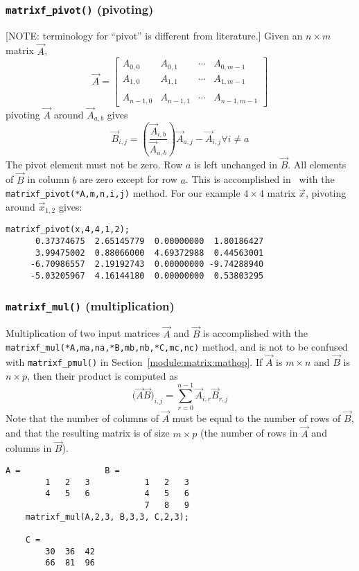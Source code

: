 \subsubsection{{\tt matrixf\_pivot()} (pivoting)}
\label{module:matrix:pivot}
[NOTE: terminology for ``pivot'' is different from literature.]
Given an $n \times m$ matrix $\vec{A}$,
\[
    \vec{A} = 
    \begin{bmatrix}
        A_{0,0}     & A_{0,1}   & \cdots  & A_{0,m-1} \\
        A_{1,0}     & A_{1,1}   & \cdots  & A_{1,m-1} \\
        \\
        A_{n-1,0}   & A_{n-1,1} & \cdots  & A_{n-1,m-1}
    \end{bmatrix}
\]
pivoting $\vec{A}$ around $\vec{A}_{a,b}$ gives
\[
    \vec{B}_{i,j} = \left(
                    \frac{\vec{A}_{i,b}}{\vec{A}_{a,b}}
                    \right)
                    \vec{A}_{a,j} - \vec{A}_{i,j}
                    \forall i \ne a
\]
The pivot element must not be zero.
Row $a$ is left unchanged in $\vec{B}$.
All elements of $\vec{B}$ in column $b$ are zero except for row $a$.
This is accomplished in \liquid\ with the
{\tt matrixf\_pivot(*A,m,n,i,j)} method.
For our example $4 \times 4$ matrix $\vec{x}$, pivoting around
$\vec{x}_{1,2}$ gives:
%
\begin{Verbatim}[fontsize=\small]
    matrixf_pivot(x,4,4,1,2);
      0.37374675  2.65145779  0.00000000  1.80186427
      3.99475002  0.88066000  4.69372988  0.44563001
     -6.70986557  2.19192743  0.00000000 -9.74288940
     -5.03205967  4.16144180  0.00000000  0.53803295
\end{Verbatim}

\subsubsection{{\tt matrixf\_mul()} (multiplication)}
\label{module:matrix:mul}
Multiplication of two input matrices $\vec{A}$ and $\vec{B}$ is accomplished
with the {\tt matrixf\_mul(*A,ma,na,*B,mb,nb,*C,mc,nc)} method,
and is not to be confused with {\tt matrixf\_pmul()}
in Section~\ref{module:matrix:mathop}.
If $\vec{A}$ is $m \times n$ and $\vec{B}$ is $n \times p$, then their product
is computed as
%
\begin{equation}
\label{eqn:matrix:mul}
    \bigl( \vec{A} \vec{B} \bigr)_{i,j}
        = \sum_{r=0}^{n-1} { \vec{A}_{i,r} \vec{B}_{r,j} }
\end{equation}
%
Note that the number of columns of $\vec{A}$ must be equal to the number of
rows of $\vec{B}$, and that the resulting matrix is of size $m \times p$
(the number of rows in $\vec{A}$ and columns in $\vec{B}$).
%
\begin{Verbatim}[fontsize=\small]
    A =                 B =
        1   2   3           1   2   3
        4   5   6           4   5   6
                            7   8   9
    matrixf_mul(A,2,3, B,3,3, C,2,3);
    
    C =
        30  36  42
        66  81  96
\end{Verbatim}


